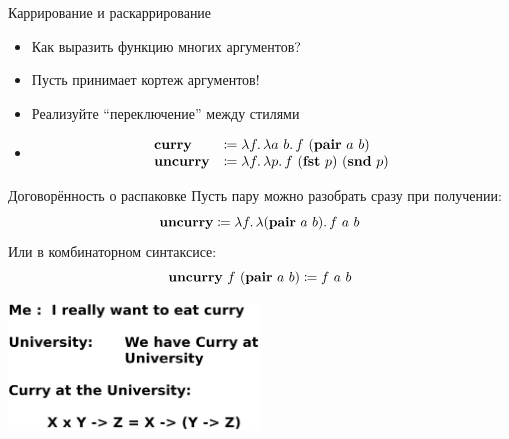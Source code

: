     \begin{frame}{Каррирование и раскаррирование}
        \begin{itemize}
            \item[\todo] Как выразить функцию многих аргументов?
            \item[\answer] \pause Пусть принимает кортеж аргументов!
            \item[\todo] Реализуйте ``переключение'' между стилями
            \item[\answer] \pause
            \[
                \begin{array}{l l}
                    \mathbf{curry}   & \coloneqq \lambda f\ldotp \lambda a~b\ldotp f~ (\mathbf{pair}~a~b)           \\
                    \mathbf{uncurry} & \coloneqq \lambda f\ldotp \lambda p\ldotp f~ (\mathbf{fst}~p)~(\mathbf{snd}~p)
                \end{array}
            \]
        \end{itemize}
        \pause
        \begin{block}{Договорённость о распаковке}
            Пусть пару можно разобрать сразу при получении:
            \[\mathbf{uncurry} \coloneqq \lambda f\ldotp \lambda (\mathbf{pair} ~ a ~ b) \ldotp f ~ a ~ b\]
            Или в комбинаторном синтаксисе:
            \[\mathbf{uncurry} ~ f ~ (\mathbf{pair} ~ a ~ b) \coloneqq f ~ a ~ b\]
        \end{block}
    \end{frame}

    \begin{frame}{}
        \begin{center}
            \vspace{3em}
            \includegraphics[width=0.5\textwidth]{figs/curry}
        \end{center}
    \end{frame}


